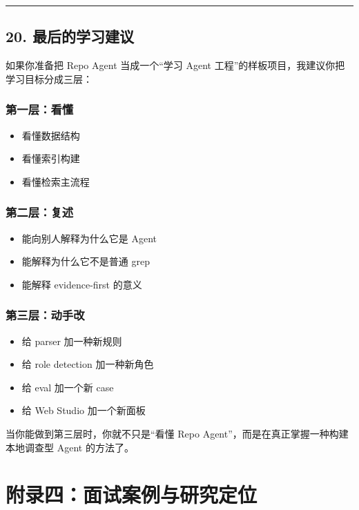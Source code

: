 \documentclass[UTF8,12pt,openany]{ctexbook}
\begin{document}
\hrule

\section{20. 最后的学习建议}

如果你准备把 Repo Agent 当成一个“学习 Agent 工程”的样板项目，我建议你把学习目标分成三层：\par

\subsection{第一层：看懂}

\begin{itemize}
\item 看懂数据结构
\item 看懂索引构建
\item 看懂检索主流程
\end{itemize}

\subsection{第二层：复述}

\begin{itemize}
\item 能向别人解释为什么它是 Agent
\item 能解释为什么它不是普通 grep
\item 能解释 evidence-first 的意义
\end{itemize}

\subsection{第三层：动手改}

\begin{itemize}
\item 给 parser 加一种新规则
\item 给 role detection 加一种新角色
\item 给 eval 加一个新 case
\item 给 Web Studio 加一个新面板
\end{itemize}

当你能做到第三层时，你就不只是“看懂 Repo Agent”，而是在真正掌握一种构建本地调查型 Agent 的方法了。\par



\clearpage
\chapter{附录四：面试案例与研究定位}
\end{document}
